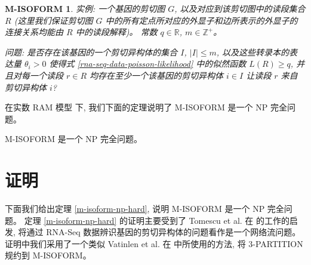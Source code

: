 \newtheorem*{misof}{M-ISOFORM}

\begin{misof}
\hspace*{1mm}

实例: 一个基因的剪切图 $G$, 以及对应到该剪切图中的读段集合 $R$ 
(这里我们保证剪切图 $G$ 中的所有定点所对应的外显子和边所表示的外显子的连接关系均能由 
$R$ 中的读段解释)。 常数 $q \in \mathbb{R}$, $m \in \mathbb{Z}^+$。 

问题: 是否存在该基因的一个剪切异构体的集合 $I$, $|I| \leq m$, 
以及这些转录本的表达量 $\theta_i > 0$
使得式 \eqref{rna-seq-data-poisson-likelihood} 中的似然函数 $L(R) \geq q$, 
并且对每一个读段 $r \in R$ 均存在至少一个该基因的剪切异构体 $i\in I$ 
让读段 $r$ 来自剪切异构体 $i$?
\end{misof}

在实数 RAM 模型 \cite{Preparata:1985:CGI:4333} 下, 
我们下面的定理说明了 M-ISOFORM 是一个 NP 完全问题。 

\begin{thm}
\label{m-isoform-np-hard}
M-ISOFORM 是一个 NP 完全问题。
\end{thm}

\section{证明}

下面我们给出定理 \ref{m-isoform-np-hard}, 说明 M-ISOFORM 是一个 NP 完全问题。 
定理 \ref{m-isoform-np-hard} 的证明主要受到了 
Tomescu et al. 在  的工作的启发, 
将通过 RNA-Seq 数据辨识基因的剪切异构体的问题看作是一个网络流问题。 
证明中我们采用了一个类似 Vatinlen et al. 在  中所使用的方法, 
将 3-PARTITION \cite{doi:10.1137/0204035, Garey:1990:CIG:574848} 规约到 M-ISOFORM。 

